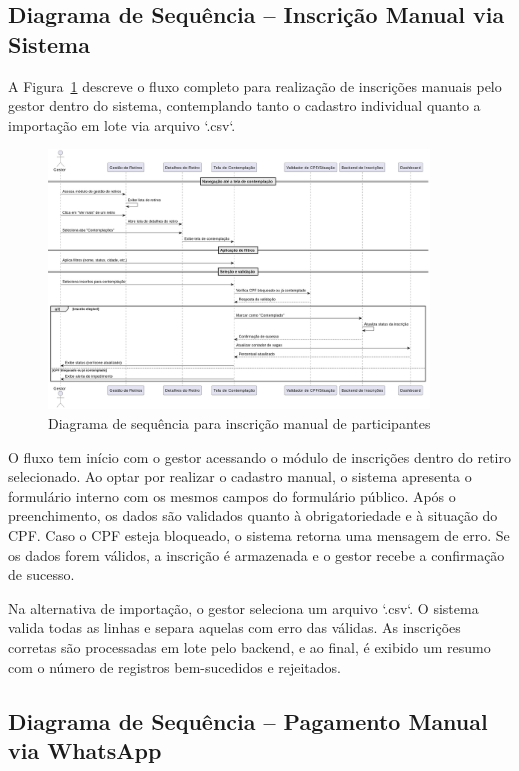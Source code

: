 \subsection{Diagrama de Sequência – Inscrição Manual via Sistema}

A Figura~\ref{fig:manualParticipantInscription} descreve o fluxo completo para realização de inscrições manuais pelo gestor dentro do sistema, contemplando tanto o cadastro individual quanto a importação em lote via arquivo `.csv`.

\begin{figure}[H]
    \centering
    \includegraphics[width=0.9\textwidth]{images/diagramasdesequencias/manualParticipantSubscription.png}
    \caption{Diagrama de sequência para inscrição manual de participantes}
    \label{fig:manualParticipantInscription}
\end{figure}

O fluxo tem início com o gestor acessando o módulo de inscrições dentro do retiro selecionado. Ao optar por realizar o cadastro manual, o sistema apresenta o formulário interno com os mesmos campos do formulário público. Após o preenchimento, os dados são validados quanto à obrigatoriedade e à situação do CPF. Caso o CPF esteja bloqueado, o sistema retorna uma mensagem de erro. Se os dados forem válidos, a inscrição é armazenada e o gestor recebe a confirmação de sucesso.

Na alternativa de importação, o gestor seleciona um arquivo `.csv`. O sistema valida todas as linhas e separa aquelas com erro das válidas. As inscrições corretas são processadas em lote pelo backend, e ao final, é exibido um resumo com o número de registros bem-sucedidos e rejeitados.

\subsection{Diagrama de Sequência – Pagamento Manual via WhatsApp}

